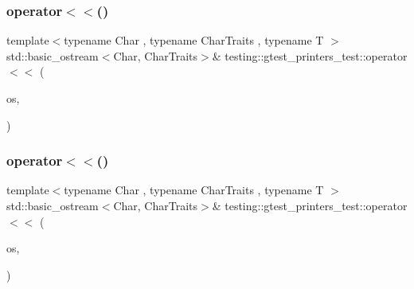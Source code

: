 \mbox{\label{namespacetesting_1_1gtest__printers__test_a5464168e925b1adf29986c8e544e908e}} 
\subsubsection{\texorpdfstring{operator$<$$<$()}{operator<<()}\hspace{0.1cm}{\footnotesize\ttfamily [2/3]}}
{\footnotesize\ttfamily template$<$typename Char , typename Char\+Traits , typename T $>$ \\
std\+::basic\+\_\+ostream$<$Char, Char\+Traits$>$\& testing\+::gtest\+\_\+printers\+\_\+test\+::operator$<$$<$ (\begin{DoxyParamCaption}\item[{std\+::basic\+\_\+ostream$<$ Char, Char\+Traits $>$ \&}]{os,  }\item[{const \hyperlink{classtesting_1_1gtest__printers__test_1_1_allows_generic_streaming_template}{Allows\+Generic\+Streaming\+Template}$<$ T $>$ \&}]{ }\end{DoxyParamCaption})}

\mbox{\label{namespacetesting_1_1gtest__printers__test_a09eedfbca613302efe6438d2a537f419}} 
\subsubsection{\texorpdfstring{operator$<$$<$()}{operator<<()}\hspace{0.1cm}{\footnotesize\ttfamily [3/3]}}
{\footnotesize\ttfamily template$<$typename Char , typename Char\+Traits , typename T $>$ \\
std\+::basic\+\_\+ostream$<$Char, Char\+Traits$>$\& testing\+::gtest\+\_\+printers\+\_\+test\+::operator$<$$<$ (\begin{DoxyParamCaption}\item[{std\+::basic\+\_\+ostream$<$ Char, Char\+Traits $>$ \&}]{os,  }\item[{const \hyperlink{classtesting_1_1gtest__printers__test_1_1_allows_generic_streaming_and_implicit_conversion_template}{Allows\+Generic\+Streaming\+And\+Implicit\+Conversion\+Template}$<$ T $>$ \&}]{ }\end{DoxyParamCaption})}

